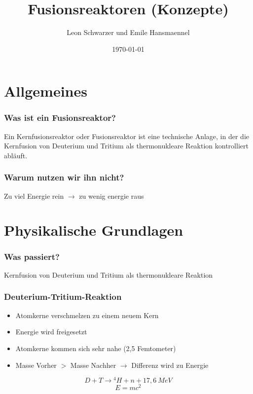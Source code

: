 \documentclass[aspectratio=169]{beamer}
\title{Fusionsreaktoren (Konzepte)}
\subtitle{}
\author{Leon Schwarzer und Emile Hansmaennel}
\institute{Theodor-Fliedner-Gymnasium}
\date{\today}
\begin{document}
  \begin{frame}
    \titlepage
  \end{frame}

  \section{Allgemeines}
    \begin{frame}
      \frametitle{Was ist ein Fusionsreaktor?}
      Ein Kernfusionsreaktor oder Fusionsreaktor ist eine
      technische Anlage, in der die Kernfusion von Deuterium und Tritium als
      thermonukleare Reaktion kontrolliert abläuft.
    \end{frame}

    \begin{frame}
      \frametitle{Warum nutzen wir ihn nicht?}
      \center
      Zu viel Energie rein \( \rightarrow \) zu wenig energie raus
    \end{frame}

  \section{Physikalische Grundlagen}
    \begin{frame}
      \frametitle{Was passiert?}
      \center
      Kernfusion von Deuterium und Tritium als thermonukleare Reaktion
    \end{frame}

    \begin{frame}
      \frametitle{Deuterium-Tritium-Reaktion}
      \begin{itemize}
        \item Atomkerne verschmelzen zu einem neuem Kern
        \pause
        \item Energie wird freigesetzt
        \pause
        \item Atomkerne kommen sich sehr nahe (2,5 Femtometer)
        \pause
        \item Masse Vorher \( > \) Masse Nachher \( \rightarrow \) Differenz wird zu Energie
        \pause
      \end{itemize}
      \bigskip
      \begin{equation}
        D + T \rightarrow {}^4 H + n + 17,6~MeV
      \end{equation}
      \begin{equation}
        E = mc^2
        \end{equation}
    \end{frame}
\end{document}
